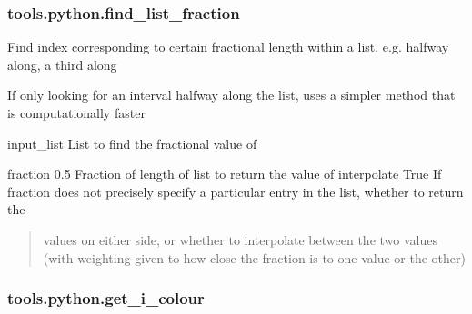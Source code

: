 \documentclass[letterpaper,10pt,english]{sphinxmanual}
\begin{document}
\subsubsection{tools.python.find\_list\_fraction}
\label{\detokenize{_autosummary/tools.python.find_list_fraction:tools-python-find-list-fraction}}\label{\detokenize{_autosummary/tools.python.find_list_fraction::doc}}

\begin{fulllineitems}
\label{\detokenize{_autosummary/tools.python.find_list_fraction:tools.python.find_list_fraction}}
\sphinxAtStartPar
Find index corresponding to certain fractional length within a list, e.g. halfway along, a third along

\sphinxAtStartPar
If only looking for an interval halfway along the list, uses a simpler method that is computationally faster

\sphinxAtStartPar
input\_list      List to find the fractional value of

\sphinxAtStartPar
fraction        0.5     Fraction of length of list to return the value of
interpolate     True    If fraction does not precisely specify a particular entry in the list, whether to return the
\begin{quote}

\sphinxAtStartPar
values on either side, or whether to interpolate between the two values (with weighting
given to how close the fraction is to one value or the other)
\end{quote}

\end{fulllineitems}



\subsubsection{tools.python.get\_i\_colour}
\label{\detokenize{_autosummary/tools.python.get_i_colour:tools-python-get-i-colour}}\label{\detokenize{_autosummary/tools.python.get_i_colour::doc}}
\end{document}
